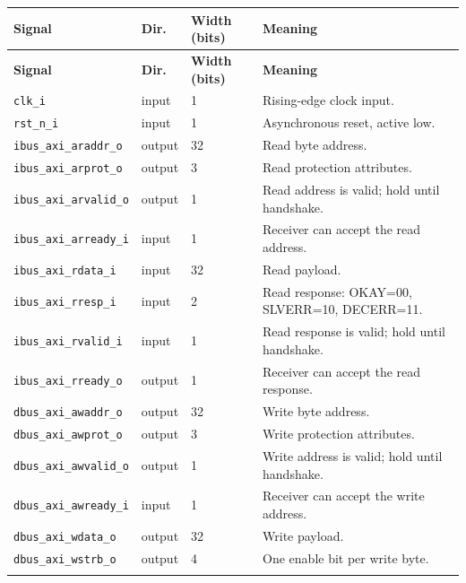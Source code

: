 \documentclass[11pt]{article}
\begin{document}
{\small
\begin{longtable}{@{}L{0.3400\dimexpr\linewidth-36pt\relax}L{0.1000\dimexpr\linewidth-36pt\relax}L{0.1000\dimexpr\linewidth-36pt\relax}L{0.4600\dimexpr\linewidth-36pt\relax}@{}}
\toprule
\textbf{Signal} & \textbf{Dir.} & \textbf{Width (bits)} & \textbf{Meaning} \\ \midrule
\endfirsthead
\toprule
\textbf{Signal} & \textbf{Dir.} & \textbf{Width (bits)} & \textbf{Meaning} \\ \midrule
\endhead
\texttt{clk\_i} & input & 1 & Rising-edge clock input. \\ \addlinespace[3pt]
\texttt{rst\_n\_i} & input & 1 & Asynchronous reset, active low. \\ \addlinespace[3pt]
\texttt{ibus\_axi\_araddr\_o} & output & 32 & Read byte address. \\ \addlinespace[3pt]
\texttt{ibus\_axi\_arprot\_o} & output & 3 & Read protection attributes. \\ \addlinespace[3pt]
\texttt{ibus\_axi\_arvalid\_o} & output & 1 & Read address is valid; hold until handshake. \\ \addlinespace[3pt]
\texttt{ibus\_axi\_arready\_i} & input & 1 & Receiver can accept the read address. \\ \addlinespace[3pt]
\texttt{ibus\_axi\_rdata\_i} & input & 32 & Read payload. \\ \addlinespace[3pt]
\texttt{ibus\_axi\_rresp\_i} & input & 2 & Read response: OKAY=00, SLVERR=10, DECERR=11. \\ \addlinespace[3pt]
\texttt{ibus\_axi\_rvalid\_i} & input & 1 & Read response is valid; hold until handshake. \\ \addlinespace[3pt]
\texttt{ibus\_axi\_rready\_o} & output & 1 & Receiver can accept the read response. \\ \addlinespace[3pt]
\texttt{dbus\_axi\_awaddr\_o} & output & 32 & Write byte address. \\ \addlinespace[3pt]
\texttt{dbus\_axi\_awprot\_o} & output & 3 & Write protection attributes. \\ \addlinespace[3pt]
\texttt{dbus\_axi\_awvalid\_o} & output & 1 & Write address is valid; hold until handshake. \\ \addlinespace[3pt]
\texttt{dbus\_axi\_awready\_i} & input & 1 & Receiver can accept the write address. \\ \addlinespace[3pt]
\texttt{dbus\_axi\_wdata\_o} & output & 32 & Write payload. \\ \addlinespace[3pt]
\texttt{dbus\_axi\_wstrb\_o} & output & 4 & One enable bit per write byte. \\ \addlinespace[3pt]

\end{longtable}}
\end{document}
